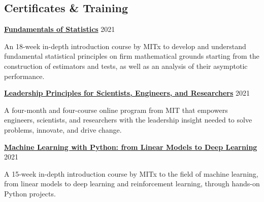 \documentclass[margin,line]{res}
\begin{document}
\begin{resume}

\section{\sc Certificates \& Training}

{\bf \href{https://www.edx.org/course/fundamentals-of-statistics}{Fundamentals of Statistics}} \hfill {2021}\\
\vspace*{-3.5mm}
\begin{addmargin}[0pt]{.1\linewidth}
\vspace*{-1mm}
An 18-week in-depth introduction course by MITx to develop and understand fundamental statistical principles on firm mathematical grounds starting from the construction of estimators and tests, as well as an analysis of their asymptotic performance.
\end{addmargin}

\vspace*{-2mm}

{\bf \href{https://xpro.mit.edu/programs/program-v1:xPRO+LASERx/}{Leadership Principles for Scientists, Engineers, and Researchers}} \hfill {2021}\\
\vspace*{-3.5mm}
\begin{addmargin}[0pt]{.1\linewidth}
\vspace*{-1mm}
A four-month and four-course online program from MIT that empowers engineers, scientists, and researchers with the leadership insight needed to solve problems, innovate, and drive change.
\end{addmargin}

\vspace*{-2mm}

{\bf \href{https://www.edx.org/course/machine-learning-with-python-from-linear-models-to}{Machine Learning with Python: from Linear Models to Deep Learning}} \hfill {2021}\\
\vspace*{-3.5mm}
\begin{addmargin}[0pt]{.1\linewidth}
\vspace*{-1mm}
A 15-week in-depth introduction course by MITx to the field of machine learning, from linear models to deep learning and reinforcement learning, through hands-on Python projects.
\end{addmargin}

\vspace*{-2mm}


\end{resume}
\end{document}
